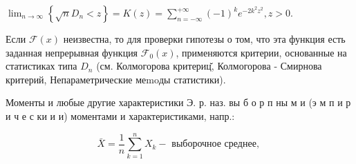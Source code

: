\documentclass[10pt]{article}
\begin{document}
$\lim _{n \rightarrow \infty}\left\{\sqrt{n} D_{n}<z\right\}=K(z)=\sum_{n=-\infty}^{+\infty}(-1)^{k} e^{-2 k^{2} z^{2}}, z>0$.



Если $\mathscr{F}(x)$ неизвестна, то для проверки гипотезы о том, что эта функция есть заданная непрерывная функция $\mathscr{F}_{0}(x)$, применяются критерии, основанные на статистиках типа $D_{n}$ (см. Колмогорова критериц̆, Колмогорова - Смирнова критерий, Непараметрические меmoды статистики).



Моменты и любые другие характеристики Э. р. наз. вы б о р п ны м и (э м п и р и ч е с ки и и) моментами и характеристиками, напр.:



\[

\bar{X}=\frac{1}{n} \sum_{k=1}^{n} X_{k}-\text { выборочное среднее, }

\]
\end{document}
